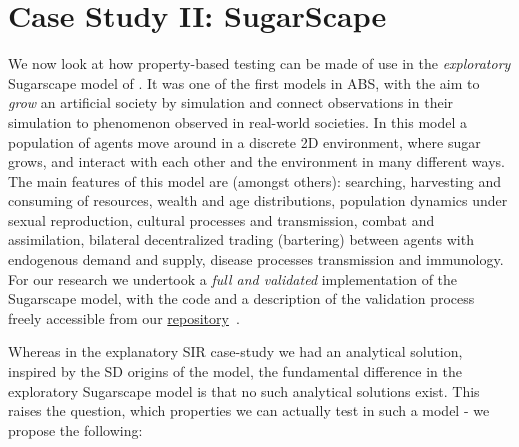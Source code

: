 \section{Case Study II: SugarScape}
\label{sec:case_sug}
We now look at how property-based testing can be made of use in the \textit{exploratory} Sugarscape model of . It was one of the first models in ABS, with the aim to \textit{grow} an artificial society by simulation and connect observations in their simulation to phenomenon observed in real-world societies. In this model a population of agents move around in a discrete 2D environment, where sugar grows, and interact with each other and the environment in many different ways. The main features of this model are (amongst others): searching, harvesting and consuming of resources, wealth and age distributions, population dynamics under sexual reproduction, cultural processes and transmission, combat and assimilation, bilateral decentralized trading (bartering) between agents with endogenous demand and supply, disease processes transmission and immunology. For our research we undertook a \textit{full and validated} implementation of the Sugarscape model, with the code and a description of the validation process freely accessible from our \href{https://github.com/thalerjonathan/haskell-sugarscape}{repository}~\cite{sugarscape_repo}. %

Whereas in the explanatory SIR case-study we had an analytical solution, inspired by the SD origins of the model, the fundamental difference in the exploratory Sugarscape model is that no such analytical solutions exist. This raises the question, which properties we can actually test in such a model - we propose the following:

